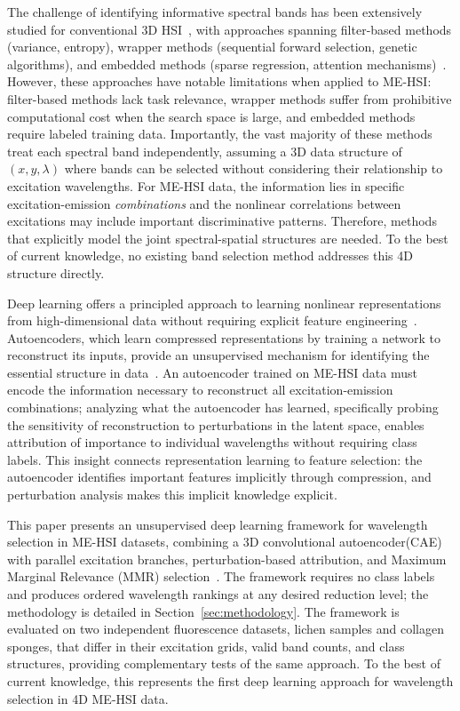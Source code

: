 The challenge of identifying informative spectral bands has been extensively studied for conventional 3D HSI~\cite{sun2019hyperspectral,jia2020survey}, with approaches spanning filter-based methods (variance, entropy), wrapper methods (sequential forward selection, genetic algorithms), and embedded methods (sparse regression, attention mechanisms)~\cite{martinez2006comparison,chang2000constrained,pudil1994floating,pal2010feature,tibshirani1996regression,mou2017deep}.
However, these approaches have notable limitations when applied to ME-HSI: filter-based methods lack task relevance, wrapper methods suffer from prohibitive computational cost when the search space is large, and embedded methods require labeled training data.
Importantly, the vast majority of these methods treat each spectral band independently, assuming a 3D data structure of $(x, y, \lambda)$ where bands can be selected without considering their relationship to excitation wavelengths.
For ME-HSI data, the information lies in specific excitation-emission \emph{combinations} and the nonlinear correlations between excitations may include important discriminative patterns.
Therefore, methods that explicitly model the joint spectral-spatial structures are needed.
To the best of current knowledge, no existing band selection method addresses this 4D structure directly.

Deep learning offers a principled approach to learning nonlinear representations from high-dimensional data without requiring explicit feature engineering~\cite{lecun2015deep}.
Autoencoders, which learn compressed representations by training a network to reconstruct its inputs, provide an unsupervised mechanism for identifying the essential structure in data~\cite{hinton2006reducing,bengio2013representation}.
An autoencoder trained on ME-HSI data must encode the information necessary to reconstruct all excitation-emission combinations; analyzing what the autoencoder has learned, specifically probing the sensitivity of reconstruction to perturbations in the latent space, enables attribution of importance to individual wavelengths without requiring class labels.
This insight connects representation learning to feature selection: the autoencoder identifies important features implicitly through compression, and perturbation analysis makes this implicit knowledge explicit.

This paper presents an unsupervised deep learning framework for wavelength selection in ME-HSI datasets, combining a 3D convolutional autoencoder(CAE) with parallel excitation branches, perturbation-based attribution, and Maximum Marginal Relevance (MMR) selection~\cite{carbonell1998use}.
The framework requires no class labels and produces ordered wavelength rankings at any desired reduction level; the methodology is detailed in Section~\ref{sec:methodology}.
The framework is evaluated on two independent fluorescence datasets, lichen samples and collagen sponges, that differ in their excitation grids, valid band counts, and class structures, providing complementary tests of the same approach.
To the best of current knowledge, this represents the first deep learning approach for wavelength selection in 4D ME-HSI data.